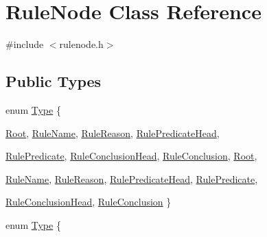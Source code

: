 \hypertarget{class_rule_node}{
\section{RuleNode Class Reference}
\label{class_rule_node}
}


{\ttfamily \#include $<$rulenode.h$>$}

\subsection*{Public Types}
\begin{DoxyCompactItemize}
\item 
enum \hyperlink{class_rule_node_af5559008a21eeb33044686b245f8e636}{Type} \{ \par
\hyperlink{class_rule_node_af5559008a21eeb33044686b245f8e636a981d39e1f15bd7216248bf76b0eb2f87}{Root}, 
\hyperlink{class_rule_node_af5559008a21eeb33044686b245f8e636a9bc7cb7031c6ac294235769e0512703b}{RuleName}, 
\hyperlink{class_rule_node_af5559008a21eeb33044686b245f8e636a4de1d3c98b39dcbc705e55fc1eb2f9ce}{RuleReason}, 
\hyperlink{class_rule_node_af5559008a21eeb33044686b245f8e636ab563e2519924fc6f3b3353caf5a97faa}{RulePredicateHead}, 
\par
\hyperlink{class_rule_node_af5559008a21eeb33044686b245f8e636a1638fb696f3c7bab9abe49750889a72c}{RulePredicate}, 
\hyperlink{class_rule_node_af5559008a21eeb33044686b245f8e636ade4f1a8272f5be0b2eba78bbac6a7c32}{RuleConclusionHead}, 
\hyperlink{class_rule_node_af5559008a21eeb33044686b245f8e636a8a6a915c2d84feec8d0b0ff805c3b50a}{RuleConclusion}, 
\hyperlink{class_rule_node_af5559008a21eeb33044686b245f8e636a981d39e1f15bd7216248bf76b0eb2f87}{Root}, 
\par
\hyperlink{class_rule_node_af5559008a21eeb33044686b245f8e636a9bc7cb7031c6ac294235769e0512703b}{RuleName}, 
\hyperlink{class_rule_node_af5559008a21eeb33044686b245f8e636a4de1d3c98b39dcbc705e55fc1eb2f9ce}{RuleReason}, 
\hyperlink{class_rule_node_af5559008a21eeb33044686b245f8e636ab563e2519924fc6f3b3353caf5a97faa}{RulePredicateHead}, 
\hyperlink{class_rule_node_af5559008a21eeb33044686b245f8e636a1638fb696f3c7bab9abe49750889a72c}{RulePredicate}, 
\par
\hyperlink{class_rule_node_af5559008a21eeb33044686b245f8e636ade4f1a8272f5be0b2eba78bbac6a7c32}{RuleConclusionHead}, 
\hyperlink{class_rule_node_af5559008a21eeb33044686b245f8e636a8a6a915c2d84feec8d0b0ff805c3b50a}{RuleConclusion}
 \}
\item 
enum \hyperlink{class_rule_node_af5559008a21eeb33044686b245f8e636}{Type} \{ \par

\end{DoxyCompactItemize}
